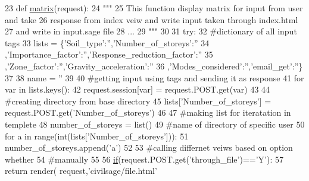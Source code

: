 \begin{DoxyCode}
23 \textcolor{keyword}{def }\hyperlink{a00036_a8b58c93a9c82e84143c43dafaa744a4b}{matrix}(request):
24     \textcolor{stringliteral}{"""}
25 \textcolor{stringliteral}{    This function display matrix for input from user and take}
26 \textcolor{stringliteral}{    response from index veiw and write input taken through index.html}
27 \textcolor{stringliteral}{    and write in input.sage file}
28 \textcolor{stringliteral}{    ...}
29 \textcolor{stringliteral}{    """}
30 
31     \textcolor{keywordflow}{try}:
32         \textcolor{comment}{#dictionary of all input tags}
33         lists = \{\textcolor{stringliteral}{'Soil\_type'}:\textcolor{stringliteral}{''},\textcolor{stringliteral}{'Number\_of\_storeys'}:\textcolor{stringliteral}{''}
34         ,\textcolor{stringliteral}{'Importance\_factor'}:\textcolor{stringliteral}{''},\textcolor{stringliteral}{'Response\_reduction\_factor'}:\textcolor{stringliteral}{''}
35         ,\textcolor{stringliteral}{'Zone\_factor'}:\textcolor{stringliteral}{''},\textcolor{stringliteral}{'Gravity\_acceleration'}:\textcolor{stringliteral}{''}
36         ,\textcolor{stringliteral}{'Modes\_considered'}:\textcolor{stringliteral}{''},\textcolor{stringliteral}{'email\_get'}:\textcolor{stringliteral}{''}\}
37 
38         name = \textcolor{stringliteral}{''}
39 
40         \textcolor{comment}{#getting input using tags and sending it as response}
41         \textcolor{keywordflow}{for} var \textcolor{keywordflow}{in} lists.keys():
42             request.session[var] = request.POST.get(var)
43 
44         \textcolor{comment}{#creating directory from base directory}
45         lists[\textcolor{stringliteral}{'Number\_of\_storeys'}] = request.POST.get(\textcolor{stringliteral}{'Number\_of\_storeys'})
46 
47         \textcolor{comment}{#making list for iteratation in templete}
48         number\_of\_storeys = list()
49         \textcolor{comment}{#name of directory of specific user}
50         \textcolor{keywordflow}{for} a \textcolor{keywordflow}{in} range(int(lists[\textcolor{stringliteral}{'Number\_of\_storeys'}])):
51             number\_of\_storeys.append(\textcolor{stringliteral}{'a'})
52 
53         \textcolor{comment}{#calling differnet veiws based on option whether}
54         \textcolor{comment}{#manually}
55 
56         \hyperlink{a00029_ac2d69f5011896c6ed4a54e0dd36f6334}{if}(request.POST.get(\textcolor{stringliteral}{'through\_file'})==\textcolor{stringliteral}{'Y'}):
57             \textcolor{keywordflow}{return} render( request,\textcolor{stringliteral}{'civilsage/file.html'}

\end{DoxyCode}

